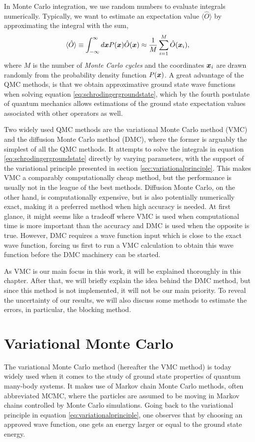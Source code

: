 In Monte Carlo integration, we use random numbers to evaluate integrals numerically. Typically, we want to estimate an expectation value $\langle\hat{O}\rangle$ by approximating the integral with the sum,
\begin{equation}
\langle \hat{O}\rangle\equiv\int_{-\infty}^{\infty}d\boldsymbol{{x}}P(\boldsymbol{{x}})\hat{O}(\boldsymbol{{x}})\approx\frac{1}{M}\sum_{i=1}^M\hat{O}(\boldsymbol{{x}}_i),
\label{eq:montecarlointegration}
\end{equation}
where $M$ is the number of \textit{Monte Carlo cycles} and the coordinates $\boldsymbol{{x}}_i$ are drawn randomly from the probability density function $P(\boldsymbol{{x}})$. A great advantage of the QMC methods, is that we obtain approximative ground state wave functions when solving equation \eqref{eq:schrodingergroundstate}, which by the fourth postulate of quantum mechanics allows estimations of the ground state expectation values associated with other operators as well. 

Two widely used QMC methods are the variational Monte Carlo method (VMC) and the diffusion Monte Carlo method (DMC), where the former is arguably the simplest of all the QMC methods. It attempts to solve the integrals in equation \eqref{eq:schrodingergroundstate} directly by varying parameters, with the support of the variational principle presented in section \ref{sec:variationalprinciple}. This makes VMC a comparably computationally cheap method, but the performance is usually not in the league of the best methods. Diffusion Monte Carlo, on the other hand, is computationally expensive, but is also potentially numerically exact, making it a preferred method when high accuracy is needed. At first glance, it might seems like a tradeoff where VMC is used when computational time is more important than the accuracy and DMC is used when the opposite is true. However, DMC requires a wave function input which is close to the exact wave function, forcing us first to run a VMC calculation to obtain this wave function before the DMC machinery can be started.

As VMC is our main focus in this work, it will be explained thoroughly in this chapter. After that, we will briefly explain the idea behind the DMC method, but since this method is not implemented, it will not be our main priority. To reveal the uncertainty of our results, we will also discuss some methods to estimate the errors, in particular, the blocking method.

\section{Variational Monte Carlo} \label{sec:vmc}
The variational Monte Carlo method (hereafter the VMC method) is today widely used when it comes to the study of ground state properties of quantum many-body systems. It makes use of Markov chain Monte Carlo methods, often abbreviated MCMC, where the particles are assumed to be moving in Markov chains controlled by Monte Carlo simulations. Going back to the variational principle in equation \eqref{eq:variationalprinciple}, one observes that by choosing an approved wave function, one gets an energy larger or equal to the ground state energy.

